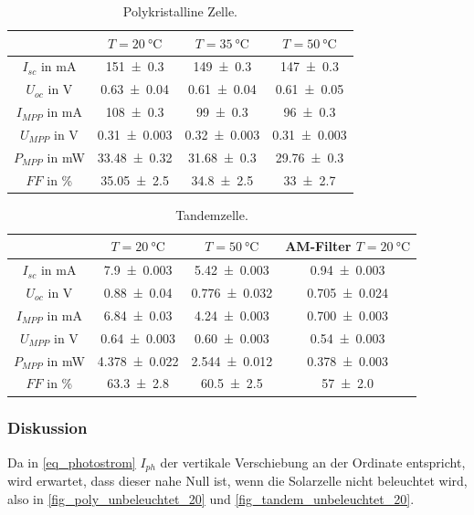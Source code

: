 \documentclass[
	a4paper,
	12pt,
	pagesize,
	ngerman
]{scrartcl}
\begin{document}
\begin{table}[H]
		\centering
		\begin{tabular}{c | c | c | c  }
			 &$T=\SI{20}{\celsius}$& $T=\SI{35}{\celsius}$& $T=\SI{50}{\celsius}$ \\ \hline
			 $I_{sc}$ in \si{mA}& \SI{151+-0.3}{}&\SI{149+-0.3}{}& \SI{147+-0.3}{} \\
			 $U_{oc}$ in \si{V}&\SI{0.63+-0.04}{}&\SI{0.61+-0.04}{}&\SI{0.61+-0.05}{} \\
			 $I_{MPP}$ in \si{mA}&\SI{108+-0.3}{}&\SI{99+-0.3}{}&\SI{96+-0.3}{} \\
			 $U_{MPP}$ in \si{V}&\SI{0.31+-0.003}{}&\SI{0.32+-0.003}{}&\SI{0.31+-0.003}{} \\
			 $P_{MPP}$ in \si{mW}&\SI{33.48+-0.32}{}&\SI{31.68+-0.3}{}&\SI{29.76+-0.3}{} \\
			 $FF$ in \si{\percent}&\SI{35.05+-2.5}{}&\SI{34.8+-2.5}{}&\SI{33+-2.7}{} \\
		\end{tabular}
		\caption{
		Polykristalline Zelle.
		}
		\label{tb_solar_param_poly}
\end{table}

\begin{table}[H]
		\centering
		\begin{tabular}{c | c | c | c  }
			 &$T=\SI{20}{\celsius}$& $T=\SI{50}{\celsius}$& AM-Filter $T=\SI{20}{\celsius}$ \\ \hline
			 $I_{sc}$ in \si{mA}& \SI{7.9+-0.003}{}&\SI{5.42+-0.003}{}& \SI{0.94+-0.003}{} \\
			 $U_{oc}$ in \si{V}&\SI{0.88+-0.04}{}&\SI{0.776+-0.032}{}&\SI{0.705+-0.024}{} \\
			 $I_{MPP}$ in \si{mA}&\SI{6.84+-0.03}{}&\SI{4.24+-0.003}{}&\SI{0.700+-0.003}{} \\
			 $U_{MPP}$ in \si{V}&\SI{0.64+-0.003}{}&\SI{0.60+-0.003}{}&\SI{0.54+-0.003}{} \\
			 $P_{MPP}$ in \si{mW}&\SI{4.378+-0.022}{}&\SI{2.544+-0.012}{}&\SI{0.378+-0.003}{} \\
			 $FF$ in \si{\percent}&\SI{63.3+-2.8}{}&\SI{60.5+-2.5}{}&\SI{57+-2.0}{} \\
		\end{tabular}
		\caption{
		Tandemzelle.
		}
		\label{tb_solar_param_tandem}
\end{table}
	\subsubsection{Diskussion}
	Da in \cref{eq_photostrom} $I_{ph}$ der vertikale Verschiebung an der Ordinate entspricht, wird erwartet, dass dieser nahe Null ist, wenn die Solarzelle nicht beleuchtet wird, also in \cref{fig_poly_unbeleuchtet_20} und \cref{fig_tandem_unbeleuchtet_20}.
\end{document}
